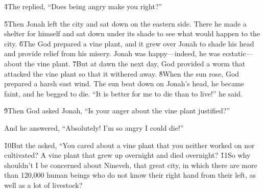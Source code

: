 \v{4}The  replied, ``Does being angry make you right?''

\v{5}Then Jonah left the city and sat down on the eastern side. There he made a shelter for himself and sat down under its shade to see what would happen to the city. \v{6}The  God prepared a vine plant, and it grew over Jonah to shade his head and provide relief from his misery. Jonah was happy---indeed, he was ecstatic---about the vine plant. \v{7}But at dawn the next day, God provided a worm that attacked the vine plant so that it withered away. \v{8}When the sun rose, God prepared a harsh east wind. The sun beat down on Jonah's head, he became faint, and he begged to die. ``It is better for me to die than to live!'' he said.

\v{9}Then God asked Jonah, ``Is your anger about the vine plant justified?''

And he answered, ``Absolutely! I'm so angry I could die!''

\v{10}But the  asked, ``You cared about a vine plant that you neither worked on nor cultivated? A vine plant that grew up overnight and died overnight? \v{11}So why shouldn't I be concerned about Nineveh, that great city, in which there are more than 120,000 human beings who do not know their right hand from their left, as well as a lot of livestock?
